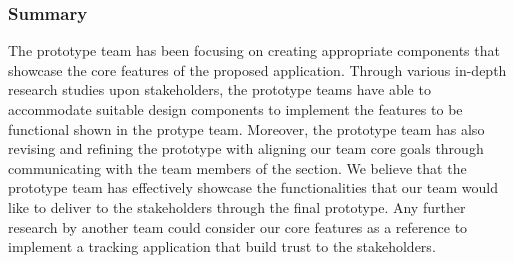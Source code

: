    \subsubsection{Summary}
      \par The prototype team has been focusing on creating appropriate components that showcase the core features of the proposed application. Through various in-depth research studies upon stakeholders, the prototype teams have able to accommodate suitable design components to implement the features to be functional shown in the protype team. Moreover, the prototype team has also revising and refining the prototype with aligning our team core goals through communicating with the team members of the section. We believe that the prototype team has effectively showcase the functionalities that our team would like to deliver to the stakeholders through the final prototype. Any further research by another team could consider our core features as a reference to implement a tracking application that build trust to the stakeholders.